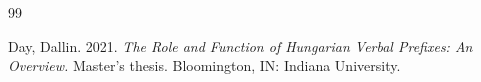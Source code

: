 \documentclass[a4paper, ruler]{CUP-JNL-LIN}%
\begin{document}
\begin{Backmatter}
\begin{thebibliography}{99}

Day, Dallin. 2021. \textit{The Role and Function of Hungarian Verbal Prefixes: An Overview.} Master's thesis. Bloomington, IN: Indiana University.


\end{thebibliography}
\end{Backmatter}
\end{document}
